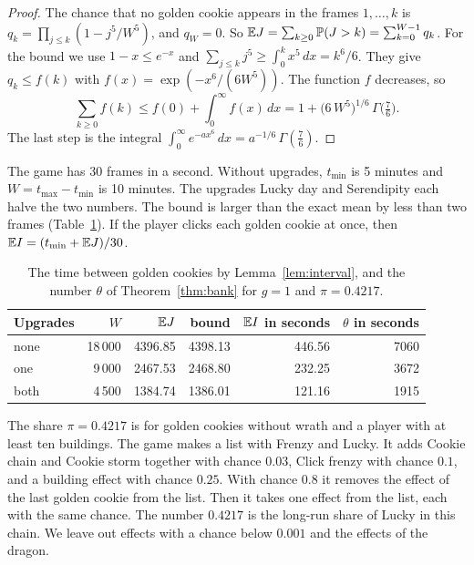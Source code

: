 \documentclass[11pt]{article}
\theoremstyle{boxed}
\begin{document}
\begin{proof}
The chance that no golden cookie appears in the frames $1,\dots,k$ is
$q_k=\prod_{j\le k}(1-j^{5}/W^{5})$, and $q_W=0$. So $\mathbb{E} J=\sum_{k\ge0}\mathbb{P}(J>k)=\sum_{k=0}^{W-1}q_k$.
For the bound we use $1-x\le e^{-x}$ and $\sum_{j\le k}j^{5}\ge\int_0^{k}x^{5}\,dx=k^{6}/6$. They
give $q_k\le f(k)$ with $f(x)=\exp(-x^{6}/(6W^{5}))$. The function $f$ decreases, so
\[
  \sum_{k\ge0}f(k)\le f(0)+\int_0^{\infty}f(x)\,dx=1+\bigl(6\,W^{5}\bigr)^{1/6}\,\Gamma\bigl(\tfrac76\bigr).
\]
The last step is the integral $\int_0^{\infty}e^{-ax^{6}}\,dx=a^{-1/6}\,\Gamma(\frac76)$.
\end{proof}

The game has 30 frames in a second. Without upgrades, $t_{\min}$ is 5 minutes and
$W=t_{\max}-t_{\min}$ is 10 minutes. The upgrades Lucky day and Serendipity each halve the two
numbers. The bound is larger than the exact mean by less than two frames
(Table~\ref{tab:interval}). If the player clicks each golden cookie at once, then $\mathbb{E} I=(t_{\min}+\mathbb{E} J)/30$.

\begin{table}[ht]
\centering\small
\begin{tabular}{@{}lrrrrr@{}}
\toprule
Upgrades & $W$ & $\mathbb{E} J$ & bound & $\mathbb{E} I$ in seconds & $\theta$ in seconds \\
\midrule
none & 18\,000 & 4396.85 & 4398.13 & 446.56 & 7060 \\
one & 9\,000 & 2467.53 & 2468.80 & 232.25 & 3672 \\
both & 4\,500 & 1384.74 & 1386.01 & 121.16 & 1915 \\
\bottomrule
\end{tabular}
\caption{The time between golden cookies by Lemma~\ref{lem:interval}, and the number $\theta$ of
Theorem~\ref{thm:bank} for $g=1$ and $\pi=0.4217$.}\label{tab:interval}
\end{table}

\begin{fineprint}
The share $\pi=0.4217$ is for golden cookies without wrath and a player with at least ten
buildings. The game makes a list with Frenzy and Lucky. It adds Cookie chain and Cookie storm
together with chance $0.03$, Click frenzy with chance $0.1$, and a building effect with chance
$0.25$. With chance $0.8$ it removes the effect of the last golden cookie from the list. Then it
takes one effect from the list, each with the same chance. The number $0.4217$ is the long-run
share of Lucky in this chain. We leave out effects with a chance below $0.001$ and the effects
of the dragon.
\end{fineprint}
\end{document}
